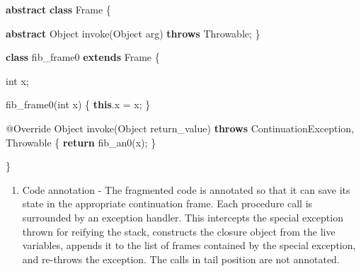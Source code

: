 \documentclass[12pt,a4paper,oneside,openright]{book}
\newenvironment{Shaded}{\begin{snugshade}}{\end{snugshade}}
\newcommand{\KeywordTok}[1]{\textcolor[rgb]{0.13,0.29,0.53}{\textbf{{#1}}}}
\newcommand{\DataTypeTok}[1]{\textcolor[rgb]{0.13,0.29,0.53}{{#1}}}
\newcommand{\FunctionTok}[1]{\textcolor[rgb]{0.00,0.00,0.00}{{#1}}}
\newcommand{\NormalTok}[1]{{#1}}
\providecommand{\tightlist}{%
  \setlength{\itemsep}{0pt}\setlength{\parskip}{0pt}}
\begin{document}
\begin{Shaded}
\begin{Highlighting}[]
    \KeywordTok{abstract} \KeywordTok{class} \NormalTok{Frame \{}

        \KeywordTok{abstract} \NormalTok{Object }\FunctionTok{invoke}\NormalTok{(Object arg)}
            \KeywordTok{throws} \NormalTok{Throwable;}
    \NormalTok{\}}

    \KeywordTok{class} \NormalTok{fib_frame0 }\KeywordTok{extends} \NormalTok{Frame \{}

        \DataTypeTok{int} \NormalTok{x;}

        \FunctionTok{fib_frame0}\NormalTok{(}\DataTypeTok{int} \NormalTok{x) \{}
            \KeywordTok{this}\NormalTok{.}\FunctionTok{x} \NormalTok{= x;}
        \NormalTok{\}}

        \FunctionTok{@Override}
        \NormalTok{Object }\FunctionTok{invoke}\NormalTok{(Object return_value)}
            \KeywordTok{throws} \NormalTok{ContinuationException, Throwable \{}
            \KeywordTok{return} \FunctionTok{fib_an0}\NormalTok{(x);}
        \NormalTok{\}}

    \NormalTok{\}}
\end{Highlighting}
\end{Shaded}

\begin{enumerate}
\def\labelenumi{\arabic{enumi}.}
\setcounter{enumi}{5}
\tightlist
\item
  Code annotation - The fragmented code is annotated so that it can save
  its state in the appropriate continuation frame. Each procedure call
  is surrounded by an exception handler. This intercepts the special
  exception thrown for reifying the stack, constructs the closure object
  from the live variables, appends it to the list of frames contained by
  the special exception, and re-throws the exception. The calls in tail
  position are not annotated.
\end{enumerate}
\end{document}
